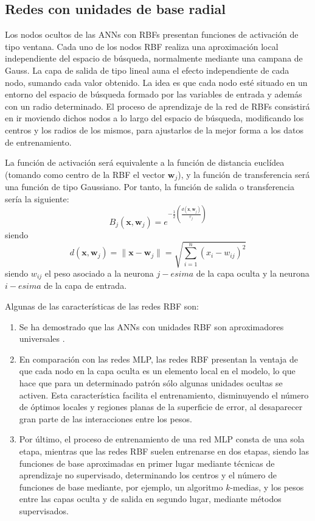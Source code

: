 \subsection{Redes con unidades de base radial}
\noindent     Los nodos ocultos de las ANNs con RBFs presentan funciones de activación de
tipo ventana.  Cada uno  de  los  nodos  RBF  realiza  una
aproximación local  independiente del  espacio  de búsqueda,  normalmente  mediante  una
campana  de Gauss.  La  capa  de  salida  de  tipo lineal  auna  el efecto  independiente
de  cada nodo,  sumando  cada  valor  obtenido.  La  idea  es  que cada  nodo  esté
situado en un entorno del espacio de búsqueda formado por las variables de entrada y
además con un radio determinado. El proceso de aprendizaje de la red de RBFs consistirá en
ir moviendo dichos nodos a lo largo del espacio de búsqueda, modificando los centros y los
radios de los mismos, para ajustarlos de la mejor forma a los datos de entrenamiento.

La  función  de  activación  será  equivalente  a  la  función  de  distancia
euclídea  (tomando  como centro de la RBF el vector $\mathbf{w}_{j}$), y la
función de
transferencia será una función de tipo Gaussiano. Por tanto, la función de
salida o transferencia sería la siguiente:
\begin{displaymath}
B_{j}\left(\mathbf{x},\mathbf{w}_{j}\right)=
e^{-\frac{1}{2}\left( \frac{d\left( \mathbf{x},\mathbf{w}_{j}\right) }{r_{j}}\right) }
\end{displaymath}
siendo
\begin{displaymath}
	d\left( \mathbf{x},\mathbf{w}_{j}\right) =\lVert
	\mathbf{x}-\mathbf{w}_{j}\rVert=\sqrt{\sum_{i=1}^n \left( x_{i}-w_{ij}\right)^2 }
\end{displaymath}
siendo $w_{ij}$ el peso asociado a la neurona $j-esima$ de la capa oculta y la neurona
$i-esima$ de la capa de entrada.

Algunas de las características de las redes RBF son:
\begin{enumerate}
		\item Se ha demostrado que las ANNs con unidades RBF son aproximadores
		universales \cite{Park1991}.
		\item En comparación con las redes MLP, las redes RBF presentan la
		ventaja de que	cada nodo en la capa oculta es un elemento local en el modelo, lo
		que hace que para	un	determinado patrón sólo algunas unidades ocultas se activen.
		Esta característica	facilita	el entrenamiento, disminuyendo el número de óptimos
		locales y regiones	planas de la superficie de error, al desaparecer gran parte
		de las	interacciones entre los pesos.
		\item Por último, el proceso de entrenamiento de una red MLP consta
		de una sola etapa, mientras que las redes RBF suelen entrenarse en dos etapas,
		siendo las	funciones	de base aproximadas en primer lugar mediante técnicas de
		aprendizaje no supervisado, determinando los centros y el número de funciones de
		base mediante, por ejemplo, un algoritmo $k$-medias,  y los	pesos	entre las capas
		oculta y de salida en segundo lugar,	mediante métodos supervisados.
\end{enumerate}


